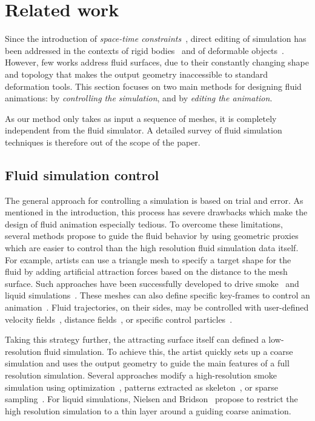 \documentclass[review]{acmsiggraph}
\begin{document}
\section{Related work}\label{sec:related_work}

Since the introduction of \emph{space-time constraints}~\cite{Witkin1988}, direct editing of simulation has been addressed in the contexts of rigid bodies~\cite{Popovic2000,Chenney2000,Twigg2007} and of deformable objects~\cite{wojtan2006keyframe,Barbic2009,Barbic2012,Schulz2014,Li2014}.
However, few works address fluid surfaces, due to their constantly changing shape and topology that makes the output geometry inaccessible to standard deformation tools.
This section focuses on two main methods for designing fluid animations: by \emph{controlling the simulation}, and by \emph{editing the animation}. 

As our method only takes as input a sequence of meshes, it is completely independent from the fluid simulator.
A detailed survey of fluid simulation techniques is therefore out of the scope of the paper.

\subsection{Fluid simulation control}
The general approach for controlling a simulation is based on trial and error.
As mentioned in the introduction, this process has severe drawbacks which make the design of fluid animation especially tedious. 
To overcome these limitations, several methods propose to guide the fluid behavior by using geometric proxies which are easier to control than the high resolution fluid simulation data itself.
For example, artists can use a triangle mesh to specify a target shape for the fluid by adding artificial attraction forces based on the distance to the mesh surface.
Such approaches have been successfully developed to drive smoke~\cite{Fattal2004,Hong2004,Shi2005a} and liquid simulations~\cite{Shi2005b,Raveendran2012}. 
These meshes can also define specific key-frames to control an animation~\cite{Treuille2003,McNamara2004}.
Fluid trajectories, on their sides, may be controlled with user-defined velocity fields~\cite{Kim2006}, distance fields~\cite{Yang2013}, or specific control particles~\cite{Thurey2006,Madill2013}. 

Taking this strategy further, the attracting surface itself can defined a low-resolution fluid simulation. 
To achieve this, the artist quickly sets up a coarse simulation and uses the output geometry to guide the main features of a full resolution simulation.
Several approaches modify a high-resolution smoke simulation using optimization~\cite{Nielsen2009,Nielsen2010}, patterns extracted as skeleton~\cite{Yuan2011}, or sparse sampling~\cite{Huang2013}.
For liquid simulations, Nielsen and Bridson~ propose to restrict the high resolution simulation to a thin layer around a guiding coarse animation.
\end{document}
